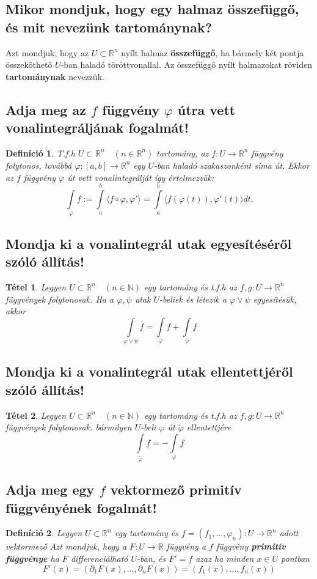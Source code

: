 \documentclass[12pt,a4paper]{article}
\newcommand{\R}{\mathbb{R}}
\newcommand{\N}{\mathbb{N}}
\newcommand{\f}{\varphi}
\newcommand{\bb}[1]{\left( #1 \right)}
\newcommand{\angels}[1]{\langle #1 \rangle}
\newcommand{\boxes}[1]{\left[ #1 \right]}
\newtheorem{tet}{Tétel}[section]
\newtheorem{defi}{Definíció}[section]
\begin{document}
\subsection{Mikor mondjuk, hogy egy halmaz összefüggő, és mit nevezünk tartománynak?}
Azt mondjuk, hogy az $U \subset \R^n$ nyílt halmaz \textbf{összefüggő}, ha bármely két pontja összeköthető $U$-ban haladó töröttvonallal. Az összefüggő nyílt halmazokat röviden \textbf{tartománynak} nevezzük.
\subsection{Adja meg az $f$ függvény $\f$ útra vett vonalintegráljának fogalmát!}
\begin{defi}
T.f.h $U \subset \R^n \quad (n \in \R^n)$ tartomány, az $f: U \to  \R^n$ függvény folytonos, továbbá $\f : \boxes{a,b} \to  \R^n$ egy $U$-ban  haladó szakaszonként sima út. Ekkor az $f$ függvény $\f$ út vett vonalintegrálját így értelmezzük:
\[
\int\limits_\f f := \int\limits^b_a \angels{f \circ \f,\f'} = \int\limits^b_a \angels{f(\f(t)), \f'(t)} dt.
\]
\end{defi}
\subsection{Mondja ki a vonalintegrál utak egyesítéséről szóló állítás!}
\begin{tet}
Legyen $U \subset \R^n \quad (n\in \N)$ egy tartomány és t.f.h az $f,g : U \to \R^n$ függvények folytonosak.
Ha a $\f,\psi$ utak $U$-beliek és létezik a $\f \vee \psi $ egyesítésük, akkor
\[
\int\limits_{\f \vee \psi } f = \int\limits_\f f + \int\limits_\psi f
\]
\end{tet}
\subsection{Mondja ki a vonalintegrál utak ellentettjéről szóló állítás!}
\begin{tet}
Legyen $U \subset \R^n \quad (n\in \N)$ egy tartomány és t.f.h az $f,g : U \to \R^n$ függvények folytonosak.
bármilyen $U$-beli $\f$ út $\tilde{\f}$ ellentettjére
\[
\int\limits_{\tilde{\f}} f = -\int\limits_\f f 
\]
\end{tet}
\subsection{Adja meg egy $f$ vektormező primitív függvényének fogalmát!}
\begin{defi}
Legyen $U \subset \R^n$ egy tartomány és  $f = (f_1,\ldots,\f_n): U \to \R^n$ adott vektormező Azt mondjuk, hogy a $F : U \to \R$ függvény a $f$ függvény \textbf{primitív függvénye} ha $F$ differenciálható $U$-ban, és $F' = f$ azaz  ha minden $x \in U$ pontban
\[
F'(x) = \bb{\partial_1F(x),\ldots,\partial_nF(x)} = \bb{f_1(x),\ldots,f_n(x)}
\]
\end{defi}
\end{document}
